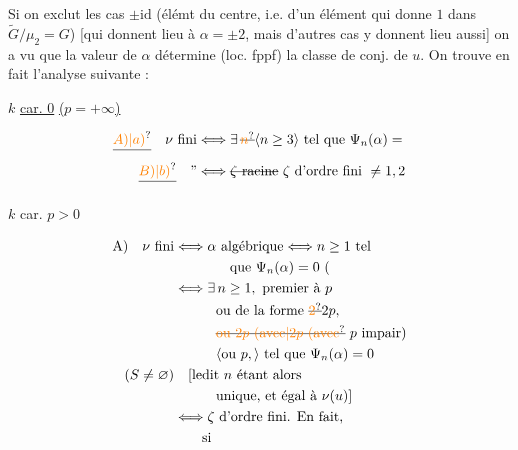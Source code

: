 Si on exclut les cas $\pm\mathrm{id}$ (élémt du centre, i.e.
d'un élément qui donne $1$ dans $\widetilde G/\mu_2=G$)
[qui donnent lieu à $\alpha=\pm2$, mais d'autres cas y
donnent lieu aussi] on a vu que la valeur
de $\alpha$ détermine (loc. fppf) la classe de conj. de
$u$. On trouve en fait l'analyse suivante :





$k$ \uline{car. 0} \uline{($p=+\infty$)}

\[
\begin{aligned}
\deleted{\unsure{A)|a)}}\quad \nu\ \text{fini}&\Longleftrightarrow\exists\,\deleted{\unsure{n}}\inserted{n\geq3}\ \text{tel que }\Psi_n(\alpha)={}\\ 
\deleted{\unsure{B)|b)}}\quad\text{''}&\Longleftrightarrow \deleted{\zeta\ \text{racine}}\ \zeta\ \text{d'ordre fini }\ne1,2
\end{aligned}
\]

$k$ car. $p>0$

\[
\begin{aligned}
\mathrm A)\quad\nu\ \text{fini}&\Longleftrightarrow\alpha\ \text{algébrique}\Longleftrightarrow n\geq1\ \text{tel}\\ 
&\hspace{4em}\text{que }\Psi_n(\alpha)=0\ (\\ 
&\Longleftrightarrow\exists\,n\geq1,\ \text{premier à }p\\ 
&\hspace{3em}\text{ou de la forme }\deleted{\unsure{2}}2p,\\ 
&\hspace{3em}\deleted{\unsure{\text{ou }2p\ (\text{avec}|2p\ (\text{avec}}}\ p\ \text{impair})\\ 
&\hspace{3em}\inserted{\text{ou }p,}\ \text{tel que }\Psi_n(\alpha)=0\\ 
(S\ne\varnothing)&\quad[\text{ledit }n\ \text{étant alors}\\ 
&\hspace{3em}\text{unique, et égal à }\nu(u)]\\ 
&\Longleftrightarrow\zeta\ \text{d'ordre fini. En fait,}\\ 
&\hspace{2em}\text{si}
\end{aligned}
\]


